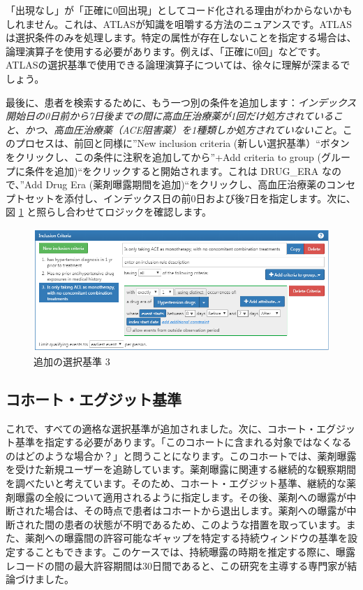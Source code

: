 \documentclass[
  11pt]{book}
\theoremstyle{definition}
\theoremstyle{definition}
\theoremstyle{definition}
\theoremstyle{definition}
\theoremstyle{remark}
\begin{document}
「出現なし」が「正確に0回出現」としてコード化される理由がわからないかもしれません。これは、ATLASが知識を咀嚼する方法のニュアンスです。ATLAS は選択条件のみを処理します。特定の属性が存在しないことを指定する場合は、論理演算子を使用する必要があります。例えば、「正確に0回」などです。ATLASの選択基準で使用できる論理演算子については、徐々に理解が深まるでしょう。

最後に、患者を検索するために、もう一つ別の条件を追加します：\emph{インデックス開始日の0日前から7日後までの間に高血圧治療薬が1回だけ処方されていること、かつ、高血圧治療薬（ACE阻害薬）を1種類しか処方されていないこと}。このプロセスは、前回と同様に''New inclusion criteria (新しい選択基準）``ボタンをクリックし、この条件に注釈を追加してから''+Add criteria to group (グループに条件を追加)``をクリックすると開始されます。これは DRUG\_ERA なので、''Add Drug Era (薬剤曝露期間を追加)``をクリックし、高血圧治療薬のコンセプトセットを添付し、インデックス日の前0日および後7日を指定します。次に、図 \ref{fig:ATLASIC3} と照らし合わせてロジックを確認します。

\begin{figure}

{\centering \includegraphics[width=1\linewidth]{images/Cohorts/ATLAS-IC3} 

}

\caption{追加の選択基準 3}\label{fig:ATLASIC3}
\end{figure}

\subsection{コホート・エグジット基準}\label{ux30b3ux30dbux30fcux30c8ux30a8ux30b0ux30b8ux30c3ux30c8ux57faux6e96}

これで、すべての適格な選択基準が追加されました。次に、コホート・エグジット基準を指定する必要があります。「このコホートに含まれる対象ではなくなるのはどのような場合か？」と問うことになります。このコホートでは、薬剤曝露を受けた新規ユーザーを追跡しています。薬剤曝露に関連する継続的な観察期間を調べたいと考えています。そのため、コホート・エグジット基準、継続的な薬剤曝露の全般について適用されるように指定します。その後、薬剤への曝露が中断された場合は、その時点で患者はコホートから退出します。薬剤への曝露が中断された間の患者の状態が不明であるため、このような措置を取っています。また、薬剤への曝露間の許容可能なギャップを特定する持続ウィンドウの基準を設定することもできます。このケースでは、持続曝露の時期を推定する際に、曝露レコードの間の最大許容期間は30日間であると、この研究を主導する専門家が結論づけました。
\end{document}
